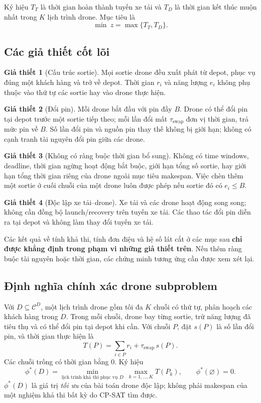 \documentclass[11pt,a4paper]{article}
\theoremstyle{definition}
\newtheorem{assumption}{Giả thiết}[section]
\theoremstyle{plain}
\theoremstyle{remark}
\newcommand{\CD}{\mathcal C^D}
\newcommand{\sw}{\tau_{\mathrm{swap}}}
\newcommand{\opt}{\phi^*}
\begin{document}
Ký hiệu $T_T$ là thời gian hoàn thành tuyến xe tải và $T_D$ là thời gian kết thúc muộn nhất trong $K$ lịch trình drone. Mục tiêu là
\begin{equation}\label{eq:objective}
\min\ z=\max\{T_T,T_D\}.
\end{equation}

\subsection{Các giả thiết cốt lõi}
\begin{assumption}[Cấu trúc sortie]
Mọi sortie drone đều xuất phát từ depot, phục vụ đúng một khách hàng và trở về depot. Thời gian $r_i$ và năng lượng $e_i$ không phụ thuộc vào thứ tự các sortie hay vào drone thực hiện.
\end{assumption}
\begin{assumption}[Đổi pin]
Mỗi drone bắt đầu với pin đầy $B$. Drone có thể đổi pin tại depot trước một sortie tiếp theo; mỗi lần đổi mất $\sw$ đơn vị thời gian, trả mức pin về $B$. Số lần đổi pin và nguồn pin thay thế không bị giới hạn; không có cạnh tranh tài nguyên đổi pin giữa các drone.
\end{assumption}
\begin{assumption}[Không có ràng buộc thời gian bổ sung]
Không có time windows, deadline, thời gian ngừng hoạt động bắt buộc, giới hạn tổng số sortie, hay giới hạn tổng thời gian riêng của drone ngoài mục tiêu makespan. Việc chèn thêm một sortie ở cuối chuỗi của một drone luôn được phép nếu sortie đó có $e_i\le B$.
\end{assumption}
\begin{assumption}[Độc lập xe tải--drone]
Xe tải và các drone hoạt động song song; không cần đồng bộ launch/recovery trên tuyến xe tải. Các thao tác đổi pin diễn ra tại depot và không làm thay đổi tuyến xe tải.
\end{assumption}

Các kết quả về tính khả thi, tính đơn điệu và hệ số lát cắt ở các mục sau \textbf{chỉ được khẳng định trong phạm vi những giả thiết trên}. Nếu thêm ràng buộc tài nguyên hoặc thời gian, các chứng minh tương ứng cần được xem xét lại.

\subsection{Định nghĩa chính xác drone subproblem}
Với $D\subseteq\CD$, một lịch trình drone gồm tối đa $K$ chuỗi có thứ tự, phân hoạch các khách hàng trong $D$. Trong mỗi chuỗi, drone bay từng sortie, trừ năng lượng đã tiêu thụ và có thể đổi pin tại depot khi cần. Với chuỗi $P$, đặt $s(P)$ là số lần đổi pin, và thời gian thực hiện là
\begin{equation}\label{eq:chain-time}
T(P)=\sum_{i\in P}r_i+\sw\,s(P).
\end{equation}
Các chuỗi trống có thời gian bằng $0$. Ký hiệu
\begin{equation}\label{eq:phi}
\opt(D)=\min_{\text{lịch trình khả thi phục vụ }D}
\ \max_{k=1,\ldots,K} T(P_k),\qquad \opt(\varnothing)=0.
\end{equation}
$\opt(D)$ là giá trị \emph{tối ưu} của bài toán drone độc lập; không phải makespan của một nghiệm khả thi bất kỳ do CP-SAT tìm được.
\end{document}
